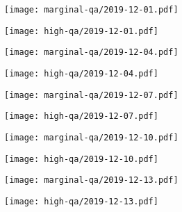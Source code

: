 \documentclass{article}
\begin{document}
\begin{figure}[H]
	\ContinuedFloat
	\centering
	\begin{subfigure}{0.48\linewidth}
		\texttt{[image: marginal-qa/2019-12-01.pdf]}
	\end{subfigure}
	\begin{subfigure}{0.48\linewidth}
		\texttt{[image: high-qa/2019-12-01.pdf]}
	\end{subfigure}
	\begin{subfigure}{0.48\linewidth}
		\texttt{[image: marginal-qa/2019-12-04.pdf]}
	\end{subfigure}
	\begin{subfigure}{0.48\linewidth}
		\texttt{[image: high-qa/2019-12-04.pdf]}
	\end{subfigure}
	\begin{subfigure}{0.48\linewidth}
		\texttt{[image: marginal-qa/2019-12-07.pdf]}
	\end{subfigure}
	\begin{subfigure}{0.48\linewidth}
		\texttt{[image: high-qa/2019-12-07.pdf]}
	\end{subfigure}
	\begin{subfigure}{0.48\linewidth}
		\texttt{[image: marginal-qa/2019-12-10.pdf]}
	\end{subfigure}
	\begin{subfigure}{0.48\linewidth}
		\texttt{[image: high-qa/2019-12-10.pdf]}
	\end{subfigure}
	\begin{subfigure}{0.48\linewidth}
		\texttt{[image: marginal-qa/2019-12-13.pdf]}
	\end{subfigure}
	\begin{subfigure}{0.48\linewidth}
		\texttt{[image: high-qa/2019-12-13.pdf]}
	\end{subfigure}
\end{figure}
\end{document}

